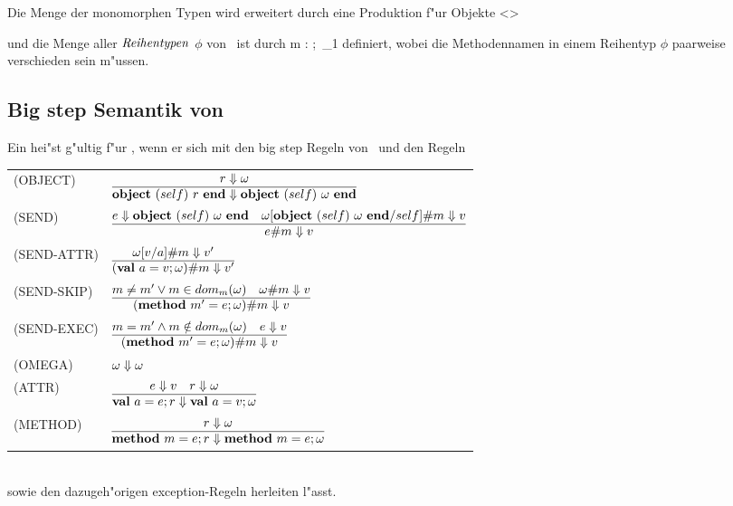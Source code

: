 Die Menge der monomorphen Typen \notation{$\Type$} wird erweitert durch eine Produktion f"ur Objekte
\bgram
\tau \is <\phi>
\egram

und die Menge \notation{$\TypeR$} aller ${\text{\it Reihentypen\/}}$ $\phi$ von \LTWOO\ ist durch
\bgram
\phi \is \emptyset
  \al m : \tau;\ \phi_1
\egram
definiert, wobei die Methodennamen in einem Reihentyp $\phi$ paarweise verschieden sein m"ussen.


\subsection{Big step Semantik von \LTWOO}

Ein  hei"st g"ultig f"ur \LTWOO, wenn er sich mit den big step Regeln von \LTWO\ und den Regeln\\[3mm]
  \begin{tabular}{ll}
    \mbox{(OBJECT)}      & $\regel{r \eval \omega}
                                  {\object{self}{r} \eval \object{self}{\omega}}$ \\[5mm]
    \mbox{(SEND)}        & $\regel{e \eval \object{self}{\omega} \quad 
                                     \send{\omega [\object{self}{\omega}/self]}{m} \eval v}
                                  {\send{e}{m} \eval v}$ \\[5mm]
    \mbox{(SEND-ATTR)}   & $\regel{\send{\omega[v/a]}{m} \eval v'}
                                  {\send{(\val{a}{v}\omega)}{m} \eval v'}$ \\[5mm]
    \mbox{(SEND-SKIP)}   & $\regel{m \neq m' \vee m \in dom_m(\omega) \quad
                                   \send{\omega}{m} \eval v}
                                  {\send{(\method{m'}{e}\omega)}{m} \eval v}$ \\[5mm]
    \mbox{(SEND-EXEC)}   & $\regel{m = m' \wedge m \notin dom_m(\omega) \quad e \eval v}
                                  {\send{(\method{m'}{e}\omega)}{m} \eval v}$ \\[5mm]
    \mbox{(OMEGA)}       & $\omega \Downarrow \omega$ \\[3mm]
    \mbox{(ATTR)}        & $\regel{e \eval v \quad r \eval \omega}
                                  {\val{a}{e}r \eval \val{a}{v}\omega}$ \\[5mm]
    \mbox{(METHOD)}      & $\regel{r \eval \omega}
                                  {\method{m}{e}r \eval \method{m}{e}\omega}$
  \end{tabular}\\[7mm]
sowie den dazugeh"origen exception-Regeln herleiten l"asst.


